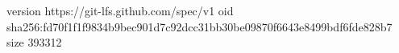 version https://git-lfs.github.com/spec/v1
oid sha256:fd70f1f1f9834b9bec901d7c92dcc31bb30be09870f6643e8499bdf6fde828b7
size 393312
